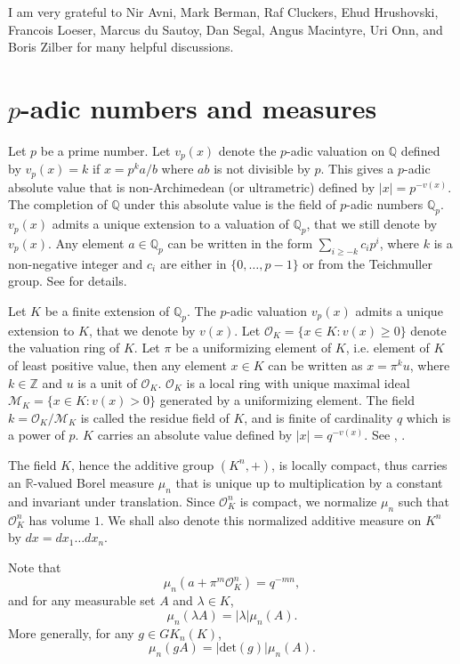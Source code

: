 \documentclass[12pt]{amsart}
\def\R{\mathbb{R}}
\def\Z{\mathbb{Z}}
\def\R{\mathbb{R}}
\def\Q{\mathbb{Q}}
\def\cM{\mathcal M}
\def\cO{\mathcal{O}}
\numberwithin{equation}{section}
\begin{document}
I am very grateful to Nir Avni, Mark Berman, Raf Cluckers, Ehud Hrushovski, Francois Loeser, Marcus du Sautoy, Dan Segal, Angus Macintyre, Uri Onn, and Boris Zilber for many helpful discussions.

\section{\bf $p$-adic numbers and measures}\label{ssec-euler}

Let $p$ be a prime number.  Let $v_p(x)$ denote the 
$p$-adic valuation on $\Q$ defined by $v_p(x)=k$ if $x=p^k a/b$ where $ab$ is not divisible by $p$. This gives a $p$-adic 
absolute value that is non-Archimedean (or ultrametric) defined by $|x|=p^{-v(x)}$. The completion of $\Q$ under 
this absolute value is the field of $p$-adic numbers $\Q_p$. $v_p(x)$ admits a unique extension to a valuation of $\Q_p$, that we still denote by $v_p(x)$. Any element $a\in \Q_p$ can be written in the form 
$\sum_{i\geq -k} c_i p^i$, where $k$ is a non-negative integer and $c_i$ are either in $\{0,\dots,p-1\}$ or from the 
Teichmuller group. See \cite{cassels} for details. 

Let $K$ be a finite extension of $\Q_p$.
The $p$-adic valuation $v_p(x)$ admits a unique extension to $K$, that we denote by $v(x)$. 
Let $\cO_K=\{x\in K: v(x)\geq 0\}$ denote the valuation ring of $K$. 
Let $\pi$ be a uniformizing element of $K$, i.e. element of $K$ of least positive value, then 
any element $x\in K$ can be written as $x=\pi^k u$, where $k\in \Z$ and $u$ is a unit of $\cO_K$. $\cO_K$ is a local ring with 
unique maximal ideal $\cM_K=\{x\in K: v(x)>0\}$ generated by a uniformizing element. The field $k=\cO_K/\cM_K$ is called the 
residue field of $K$, and is finite of cardinality $q$ which is a power of $p$. $K$ carries an absolute value defined by 
$|x|=q^{-v(x)}$. See \cite{cassels}, \cite{ramak}.

The field $K$, hence the additive group $(K^n,+)$, is locally compact, thus carries an $\R$-valued Borel measure $\mu_n$ that is unique up to multiplication by a constant and invariant under translation. Since $\cO_K^n$ is compact, we normalize $\mu_n$ such that $\cO_K^n$ has volume $1$. We shall also denote this normalized additive measure on $K^n$ by 
$dx=dx_1\dots dx_n$.

Note that $$\mu_n(a+\pi^m \cO_K^n)=q^{-mn},$$
and for any measurable set $A$ and $\lambda \in K$, 
$$\mu_n(\lambda A)=|\lambda|\mu_n(A).$$ 
More generally, for any $g\in GK_n(K)$,
$$\mu_n(gA)=|\mathrm{det}(g)|\mu_n(A).$$
\end{document}
